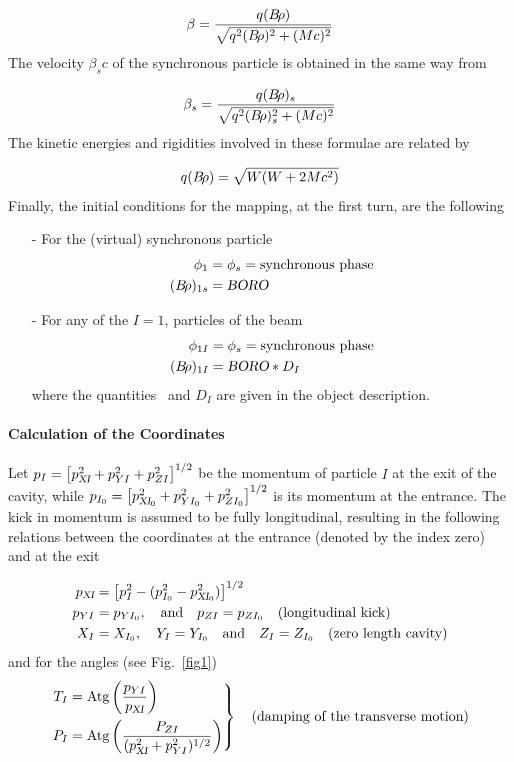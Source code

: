 $$ \beta  = \dfrac{q(B\!\rho ) }{ \sqrt{ q^2(B\!\rho )^2+(Mc)^2}} $$
%
 The velocity $ \beta_ sc $ of the synchronous particle is obtained
in the same way from

$$ \beta_ s = \dfrac{q(B\!\rho )_s }{ \sqrt{ q^2(B\!\rho )^2_s + (Mc)^2}} $$
%
 The kinetic energies and rigidities involved in these formulae are related by

$$ q(B\!\rho ) = \sqrt{ W(W+2Mc^2)} $$
%
 Finally, the initial conditions for the mapping, at the first 
turn, are the following  
\begin{itemize}
\item[-] For the (virtual) synchronous particle
%
\begin{align*}
	\phi_ 1 &  = \phi_ s = \text{synchronous phase}  \\
	(B\!\rho )_{1s} & = \textsl{BORO}  
\end{align*}

\item[-] For any of the $ I=1$,  \IMAX{}  particles of the beam 
%
\begin{align*}
	\phi_{1I} & = \phi_ s = \text{synchronous  phase} \\
	(B\!\rho )_{1I} & =\textsl{BORO} \ast  D_I
\end{align*}
%
\noindent where the quantities \BORO\ and $ D_I $ are given in the object description. 
\end{itemize}

\paragraph{Calculation of the Coordinates} 

\noindent Let   $ p_I= \left[p^2_{\textsl{XI}}+p^2_{YI}+p^2_{ZI} \right]^{1/2} $ be the momentum of particle 
$ I $ at the exit of the cavity, while   %
$ p_{I_0}= \left[p^2_{\textsl{XI}_0}+p^2_{YI_0} + p^2_{ZI_0}\right]^{1/2} $ is its 
momentum at the entrance. The kick in momentum is assumed to be 
fully longitudinal, resulting in the following relations between 
the coordinates at the entrance (denoted by the index zero) and at the exit 

 \begin{align*}
	 p_{\textsl{XI}} 
	      & = \left[p^2_I-(p^2_{I_0}-p^2_{\textsl{XI}_0}) \right]^{1/2} \\
	p_{YI} & = p_{YI_0},\quad \text{and} \quad  p_{ZI}= p_{ZI_0} \quad\text{(longitudinal  kick)} \\ 
	X_I &  = X_{I_0},\quad Y_I=Y_{I_0}\quad  \text{and} 
	        \quad Z_I=Z_{I_0} \quad\text{(zero  length cavity)}   
 \end{align*}
%
and for the angles (see Fig.~\ref{fig1})  
%
\begin{equation*}
	\left. 
	\begin{aligned}
		T_I & =  \text{Atg} \left( \dfrac{p_{YI}}{ p_{\textsl{XI}}} \right) \\
		P_I &  =  \text{Atg} \left(\dfrac{P_{ZI}}{(p^2_{\textsl{XI}}+p^2_{YI})^{1/2}} \right) 
	\end{aligned}
	 \right\rbrace \quad \text{(damping  of the  transverse  motion)}
\end{equation*}  

